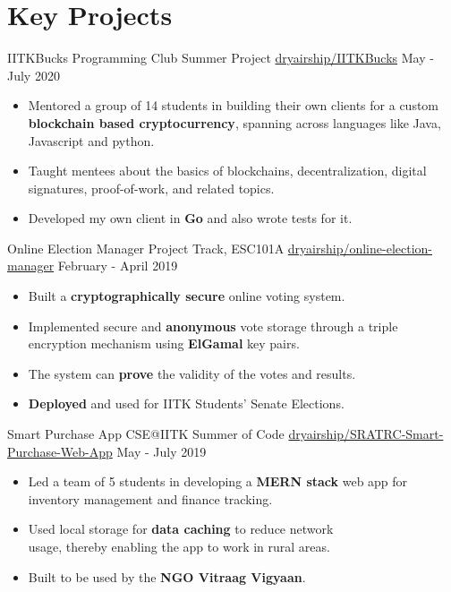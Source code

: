 \section*{\sc Key Projects}
\vspace{-2mm}
\hrulefill
\vspace{1mm}

\cventry
{IITKBucks}
{Programming Club Summer Project}
{\href{https://github.com/dryairship/IITKBucks}{\faGithub{} dryairship/IITKBucks}}
{May - July 2020}
{
  \begin{itemize}
  \item Mentored a group of 14 students in building their own clients for a custom \textbf{blockchain based cryptocurrency}, spanning across languages like Java, Javascript and python.
  \item Taught mentees about the basics of blockchains, decentralization, digital signatures, proof-of-work, and related topics.
  \item Developed my own client in \textbf{Go} and also wrote tests for it.
  \end{itemize}
}

\cventry
{Online Election Manager}
{Project Track, ESC101A}
{\href{https://github.com/dryairship/online-election-manager}{\faGithub{} dryairship/online-election-manager}}
{February - April 2019}
{
  \begin{itemize}
  \item Built a \textbf{cryptographically secure} online voting system.
  \item Implemented secure and \textbf{anonymous} vote storage through a triple encryption mechanism using \textbf{ElGamal} key pairs.
  \item The system can \textbf{prove} the validity of the votes and results.
  \item \textbf{Deployed} and used for IITK Students' Senate Elections.
  \end{itemize}
}

\cventry
{Smart Purchase App}
{CSE@IITK Summer of Code}
{
  \href{https://github.com/dryairship/SRATRC-Smart-Purchase-Web-App}{\faGithub{} dryairship/SRATRC-Smart-Purchase-Web-App}
}
{May - July 2019}
{
  \begin{itemize}
  \item Led a team of 5 students in developing a \textbf{MERN stack} web app for inventory management and finance tracking.
  \item Used local storage for \textbf{data caching} to reduce network\\usage, thereby enabling the app to work in rural areas.
  \item Built to be used by the \textbf{NGO Vitraag Vigyaan}.
  \end{itemize}
}

